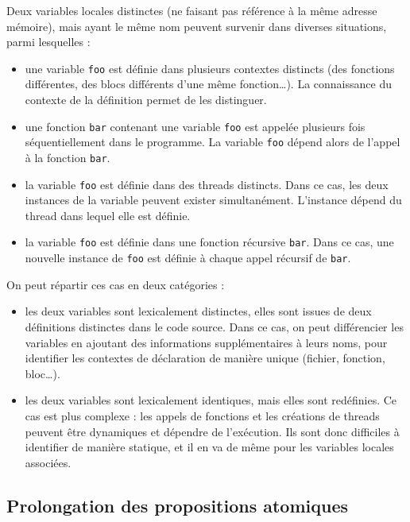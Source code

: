 Deux variables locales distinctes (ne faisant pas référence à la même
adresse mémoire), mais ayant le même nom peuvent survenir dans diverses situations,
parmi lesquelles :

\begin{itemize}
\item
  une variable \texttt{foo} est définie dans plusieurs contextes
  distincts (des fonctions différentes, des blocs différents d'une même
  fonction\ldots{}). La connaissance du contexte de la définition permet
  de les distinguer.
\item
  une fonction \texttt{bar} contenant une variable \texttt{foo}
  est appelée plusieurs fois séquentiellement dans le programme. La
  variable \texttt{foo} dépend alors de l'appel à la fonction
  \texttt{bar}.
\item
  la variable \texttt{foo} est définie dans des threads distincts.
  Dans ce cas, les deux instances de la variable peuvent exister
  simultanément. L'instance dépend du thread dans lequel elle est
  définie.
\item
  la variable \texttt{foo} est définie dans une fonction récursive
  \texttt{bar}. Dans ce cas, une nouvelle instance de \texttt{foo}
  est définie à chaque appel récursif de \texttt{bar}.
\end{itemize}

On peut répartir ces cas en deux catégories :

\begin{itemize}
\item
  les deux variables sont lexicalement distinctes, elles sont issues de
  deux définitions distinctes dans le code source. Dans ce cas, on peut
  différencier les variables en ajoutant des informations
  supplémentaires à leurs noms, pour identifier les contextes de
  déclaration de manière unique (fichier, fonction, bloc\ldots{}).
\item
  les deux variables sont lexicalement identiques, mais elles sont
  redéfinies. Ce cas est plus complexe : les appels de fonctions et les
  créations de threads peuvent être dynamiques et dépendre de l'exécution.
  Ils sont donc difficiles à identifier de manière statique, et il en va
  de même pour les variables locales associées.
\end{itemize}

\subsection{Prolongation des propositions atomiques}

